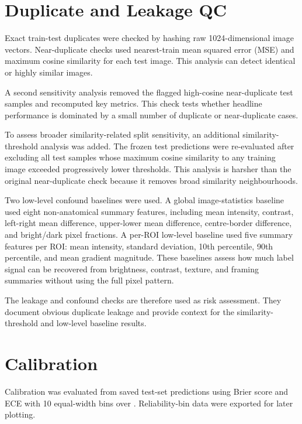 \section{Duplicate and Leakage QC}

Exact train-test duplicates were checked by hashing raw 1024-dimensional image vectors. Near-duplicate checks used nearest-train mean squared error (MSE) and maximum cosine similarity for each test image. This analysis can detect identical or highly similar images.


A second sensitivity analysis removed the flagged high-cosine near-duplicate test samples and recomputed key metrics. This check tests whether headline performance is dominated by a small number of duplicate or near-duplicate cases.


To assess broader similarity-related split sensitivity, an additional similarity-threshold analysis was added. The frozen test predictions were re-evaluated after excluding all test samples whose maximum cosine similarity to any training image exceeded progressively lower thresholds. This analysis is harsher than the original near-duplicate check because it removes broad similarity neighbourhoods.


Two low-level confound baselines were used. A global image-statistics baseline used eight non-anatomical summary features, including mean intensity, contrast, left-right mean difference, upper-lower mean difference, centre-border difference, and bright/dark pixel fractions. A per-ROI low-level baseline used five summary features per ROI: mean intensity, standard deviation, 10th percentile, 90th percentile, and mean gradient magnitude. These baselines assess how much label signal can be recovered from brightness, contrast, texture, and framing summaries without using the full pixel pattern.


The leakage and confound checks are therefore used as risk assessment. They document obvious duplicate leakage and provide context for the similarity-threshold and low-level baseline results.


\section{Calibration}

Calibration was evaluated from saved test-set predictions using Brier score and ECE with 10 equal-width bins over \texttt{}  . Reliability-bin data were exported for later plotting.


